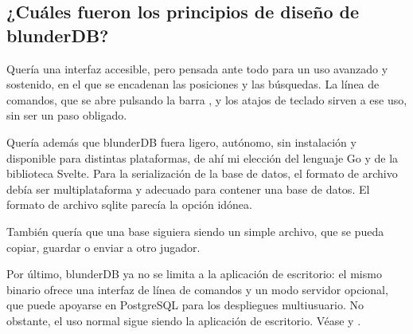\documentclass[letterpaper,10pt,spanish]{sphinxmanual}
\begin{document}
\subsection{¿Cuáles fueron los principios de diseño de blunderDB?}
\label{\detokenize{faq:quelles-ont-ete-les-principes-de-conception-de-blunderdb}}
\sphinxAtStartPar
Quería una interfaz accesible, pero pensada ante todo para un uso avanzado y sostenido, en el que se encadenan las posiciones y las búsquedas. La línea de comandos, que se abre pulsando la barra , y los atajos de teclado sirven a ese uso, sin ser un paso obligado.

\sphinxAtStartPar
Quería además que blunderDB fuera ligero, autónomo, sin instalación y disponible para distintas plataformas, de ahí mi elección del lenguaje Go y de la biblioteca Svelte. Para la serialización de la base de datos, el formato de archivo debía ser multiplataforma y adecuado para contener una base de datos. El formato de archivo sqlite parecía la opción idónea.

\sphinxAtStartPar
También quería que una base siguiera siendo un simple archivo, que se pueda copiar, guardar o enviar a otro jugador.

\sphinxAtStartPar
Por último, blunderDB ya no se limita a la aplicación de escritorio: el mismo binario ofrece una interfaz de línea de comandos y un modo servidor opcional, que puede apoyarse en PostgreSQL para los despliegues multiusuario. No obstante, el uso normal sigue siendo la aplicación de escritorio. Véase {\hyperref[\detokenize{cli:cli}]{}} y {\hyperref[\detokenize{mode_headless:headless}]{}}.
\end{document}
